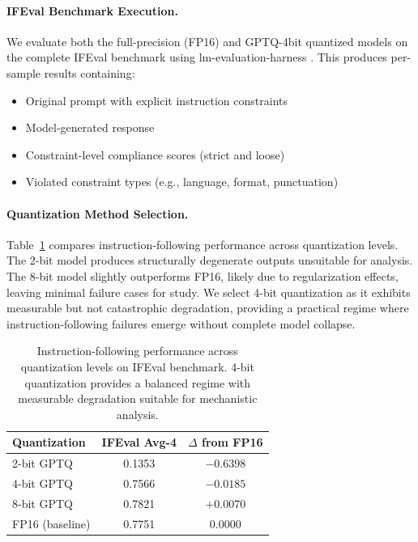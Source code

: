 \paragraph{IFEval Benchmark Execution.}
We evaluate both the full-precision (FP16) and GPTQ-4bit quantized models on 
the complete IFEval benchmark using lm-evaluation-harness \cite{eval-harness}. 
This produces per-sample results containing:
\begin{itemize}
    \item Original prompt with explicit instruction constraints
    \item Model-generated response
    \item Constraint-level compliance scores (strict and loose)
    \item Violated constraint types (e.g., language, format, punctuation)
\end{itemize}

\paragraph{Quantization Method Selection.}
Table~\ref{tab:quant-comparison} compares instruction-following 
performance across quantization levels. The 2-bit model produces 
structurally degenerate outputs unsuitable for analysis. The 8-bit 
model slightly outperforms FP16, likely due to regularization effects, 
leaving minimal failure cases for study. We select 4-bit quantization 
as it exhibits measurable but not catastrophic degradation, providing 
a practical regime where instruction-following failures emerge without 
complete model collapse.

\begin{table}[h]
\centering
\small
\begin{tabular}{@{}lcc@{}}
\toprule
\textbf{Quantization} & \textbf{IFEval Avg-4} & \textbf{$\Delta$ from FP16} \\
\midrule
2-bit GPTQ & 0.1353 & $-0.6398$ \\
4-bit GPTQ & 0.7566 & $-0.0185$ \\
8-bit GPTQ & 0.7821 & $+0.0070$ \\
FP16 (baseline) & 0.7751 & $0.0000$ \\
\bottomrule
\end{tabular}
\caption{Instruction-following performance across quantization 
levels on IFEval benchmark. 4-bit quantization provides a balanced 
regime with measurable degradation suitable for mechanistic analysis.}
\label{tab:quant-comparison}
\end{table}

